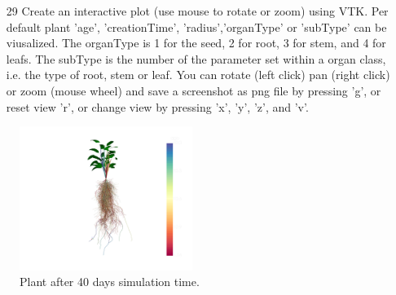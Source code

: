\begin{itemize}
 \item[29] Create an interactive plot (use mouse to rotate or zoom) using VTK. Per default plant 'age', 'creationTime', 'radius','organType' or 'subType' can be viusalized. The organType is 1 for the seed, 2 for root, 3 for stem, and 4 for leafs. The subType is the number of the parameter set within a organ class, i.e. the type of root, stem or leaf. You can rotate (left click) pan (right click) or zoom (mouse wheel) and save a screenshot as png file by pressing 'g', or reset view 'r', or change view by pressing 'x', 'y', 'z', and 'v'.
 \end{itemize}
  
\begin{figure}
\centering
\includegraphics[width=0.5\textwidth]{figures/intro_basic.png} 
\caption{Plant after 40 days simulation time.} \label{fig:intro_basic}
\end{figure}  
